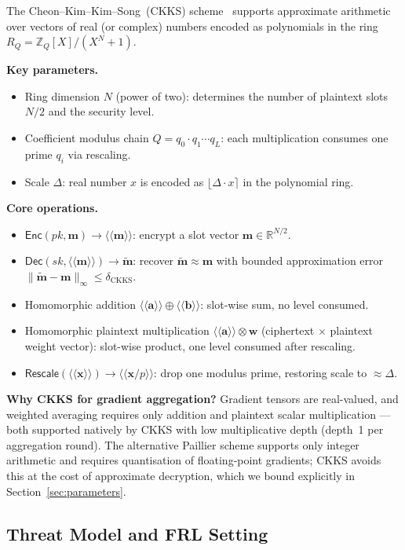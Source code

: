 \documentclass[letterpaper,journal]{IEEEtran}
\newcommand{\ct}[1]{\langle\!\langle #1 \rangle\!\rangle}
\newcommand{\Enc}{\mathsf{Enc}}
\newcommand{\Dec}{\mathsf{Dec}}
\newcommand{\Rescale}{\mathsf{Rescale}}
\newcommand{\RR}{\mathbb{R}}
\newcommand{\ZZ}{\mathbb{Z}}
\begin{document}
The Cheon--Kim--Kim--Song~(CKKS) scheme~\cite{ckks2017} supports approximate
arithmetic over vectors of real (or complex) numbers encoded as polynomials in
the ring $R_Q = \ZZ_Q[X]/(X^N+1)$.

\textbf{Key parameters.}
\begin{itemize}
  \item Ring dimension $N$ (power of two): determines the number of plaintext
        slots $N/2$ and the security level.
  \item Coefficient modulus chain $Q = q_0 \cdot q_1 \cdots q_L$: each
        multiplication consumes one prime $q_i$ via rescaling.
  \item Scale $\Delta$: real number $x$ is encoded as $\lfloor \Delta \cdot x
        \rceil$ in the polynomial ring.
\end{itemize}

\textbf{Core operations.}
\begin{itemize}
  \item $\Enc(pk, \mathbf{m}) \to \ct{\mathbf{m}}$: encrypt a slot vector
        $\mathbf{m} \in \RR^{N/2}$.
  \item $\Dec(sk, \ct{\mathbf{m}}) \to \tilde{\mathbf{m}}$: recover
        $\tilde{\mathbf{m}} \approx \mathbf{m}$ with bounded approximation
        error $\|\tilde{\mathbf{m}} - \mathbf{m}\|_\infty \leq \delta_{\text{CKKS}}$.
  \item Homomorphic addition $\ct{\mathbf{a}} \oplus \ct{\mathbf{b}}$:
        slot-wise sum, no level consumed.
  \item Homomorphic plaintext multiplication $\ct{\mathbf{a}} \otimes
        \mathbf{w}$ (ciphertext $\times$ plaintext weight vector): slot-wise
        product, one level consumed after rescaling.
  \item $\Rescale(\ct{\mathbf{x}}) \to \ct{\mathbf{x}/p}$: drop one modulus
        prime, restoring scale to $\approx \Delta$.
\end{itemize}

\textbf{Why CKKS for gradient aggregation?}
Gradient tensors are real-valued, and weighted averaging requires only
addition and plaintext scalar multiplication — both supported natively by CKKS
with low multiplicative depth (depth~1 per aggregation round).
The alternative Paillier scheme supports only integer arithmetic and requires
quantisation of floating-point gradients; CKKS avoids this at the cost of
approximate decryption, which we bound explicitly in
Section~\ref{sec:parameters}.

\subsection{Threat Model and FRL Setting}\label{sec:threat}
\end{document}
